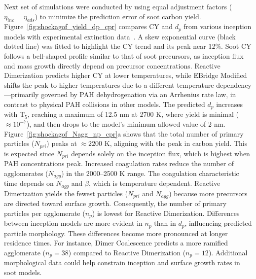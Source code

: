 Next set of simulations were conducted by using equal adjustment factors ($\eta_{inc}=\eta_{ads}$) to minimize the prediction error of soot carbon yield. Figure~\ref{fig:shockagof_yield_dp_cpr} compares CY and $d_p$ from various inception models with experimental extinction data~\citep{agafonov2016unified}. A skew exponential curve (black dotted line) was fitted to highlight the CY trend and its peak near 12\%. Soot CY follows a bell-shaped profile similar to that of soot precursors, as inception flux and mass growth directly depend on precursor concentrations. Reactive Dimerization predicts higher CY at lower temperatures, while EBridge Modified shifts the peak to higher temperatures due to a different temperature dependency—primarily governed by PAH dehydrogenation via an Arrhenius rate law, in contrast to physical PAH collisions in other models. The predicted $d_p$ increases with $\mathrm{T_5}$, reaching a maximum of 12.5 nm at 2700 K, where yield is minimal ($\approx 10^{-7}$), and then drops to the model's minimum allowed value of 2 nm. Figure~\ref{fig:shockagof_Nagg_np_cpr}a shows that the total number of primary particles ($N_{pri}$) peaks at $\approx 2200$ K, aligning with the peak in carbon yield. This is expected since $N_{pri}$ depends solely on the inception flux, which is highest when PAH concentrations peak. Increased coagulation rates reduce the number of agglomerates ($N_{agg}$) in the 2000--2500 K range. The coagulation characteristic time depends on $N_{agg}$ and $\beta$, which is temperature dependent. Reactive Dimerization yields the fewest particles ($N_{pri}$ and $N_{agg}$) because more precursors are directed toward surface growth. Consequently, the number of primary particles per agglomerate ($n_p$) is lowest for Reactive Dimerization. Differences between inception models are more evident in $n_p$ than in $d_p$, influencing predicted particle morphology. These differences become more pronounced at longer residence times. For instance, Dimer Coalescence predicts a more ramified agglomerate ($n_p = 38$) compared to Reactive Dimerization ($n_p = 12$). Additional morphological data could help constrain inception and surface growth rates in soot models.

